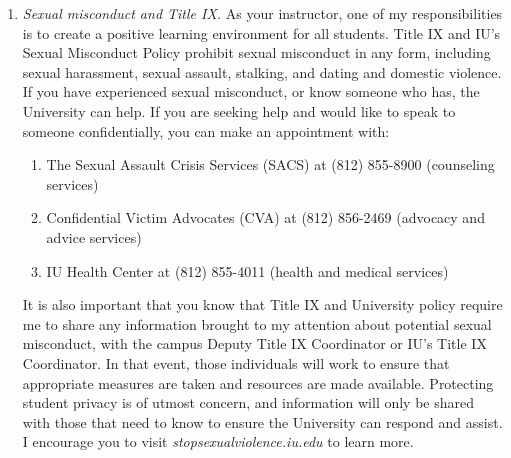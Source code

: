 \documentclass[11pt,article,oneside]{memoir} %
\begin{document}
\begin{enumerate}
\item \emph{Sexual misconduct and Title IX.} As your instructor, one of my
responsibilities is to create a positive learning environment for all students.
Title IX and IU's Sexual Misconduct Policy prohibit sexual misconduct in any
form, including sexual harassment, sexual assault, stalking, and dating and
domestic violence.  If you have experienced sexual misconduct, or know someone
who has, the University can help. If you are seeking help and would like to
speak to someone confidentially, you can make an appointment with:

\begin{enumerate}
    
\item The Sexual Assault Crisis Services (SACS) at (812) 855-8900 (counseling services)
\item Confidential Victim Advocates (CVA) at (812) 856-2469 (advocacy and advice services)
\item IU Health Center at (812) 855-4011 (health and medical services)

\end{enumerate}

It is also important that you know that Title IX and University policy require me to share any information brought to my attention about potential sexual misconduct, with the campus Deputy Title IX Coordinator or IU's Title IX Coordinator. 
In that event, those individuals will work to ensure that appropriate measures are taken and resources are made available. 
Protecting student privacy is of utmost concern, and information will only be shared with those that need to know to ensure the University can respond and assist. 
I encourage you to visit \emph{stopsexualviolence.iu.edu} to learn more. 






\end{enumerate}%
\end{document}
